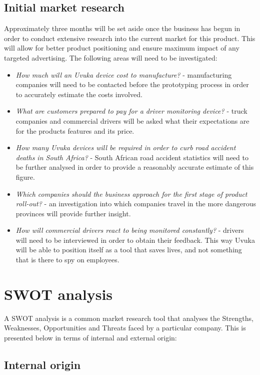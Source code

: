 \subsection{Initial market research}
Approximately three months will be set aside once the business has begun in order to conduct extensive research into the current market for this product. This will allow for better product positioning and ensure maximum impact of any targeted advertising. The following areas will need to be investigated:
\begin{itemize}
	\item \textit{How much will an Uvuka device cost to manufacture?} - manufacturing companies will need to be contacted before the prototyping process in order to accurately estimate the costs involved.
	\item \textit{What are customers prepared to pay for a driver monitoring device?} - truck companies and commercial drivers will be asked what their expectations are for the products features and its price.
	\item \textit{How many Uvuka devices will be required in order to curb road accident deaths in South Africa?} - South African road accident statistics will need to be further analysed in order to provide a reasonably accurate estimate of this figure.
	\item \textit{Which companies should the business approach for the first stage of product roll-out?} - an investigation into which companies travel in the more dangerous provinces will provide further insight.
	\item \textit{How will commercial drivers react to being monitored constantly?} - drivers will need to be interviewed in order to obtain their feedback. This way Uvuka will be able to position itself as a tool that saves lives, and not something that is there to spy on employees.
\end{itemize}

 \section{SWOT analysis}
A SWOT analysis is a common market research tool that analyses the Strengths, Weaknesses, Opportunities and Threats faced by a particular company. This is presented below in terms of internal and external origin:
\pagebreak
\subsection{Internal origin}
